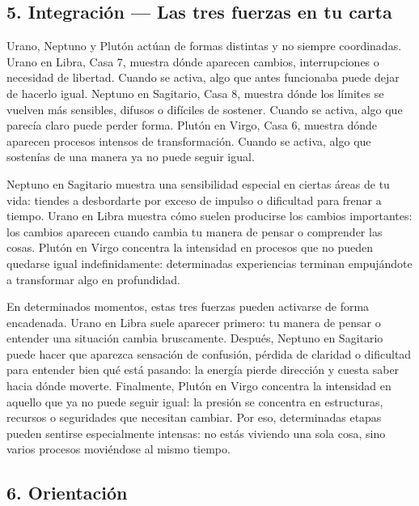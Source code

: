 \documentclass[11pt,a4paper]{article}
\begin{document}
\vspace{0.8cm}

\subsection{5. Integración — Las tres fuerzas en tu carta}

Urano, Neptuno y Plutón actúan de formas distintas y no siempre coordinadas. Urano en Libra, Casa 7, muestra dónde aparecen cambios, interrupciones o necesidad de libertad. Cuando se activa, algo que antes funcionaba puede dejar de hacerlo igual. Neptuno en Sagitario, Casa 8, muestra dónde los límites se vuelven más sensibles, difusos o difíciles de sostener. Cuando se activa, algo que parecía claro puede perder forma. Plutón en Virgo, Casa 6, muestra dónde aparecen procesos intensos de transformación. Cuando se activa, algo que sostenías de una manera ya no puede seguir igual.

Neptuno en Sagitario muestra una sensibilidad especial en ciertas áreas de tu vida: tiendes a desbordarte por exceso de impulso o dificultad para frenar a tiempo. Urano en Libra muestra cómo suelen producirse los cambios importantes: los cambios aparecen cuando cambia tu manera de pensar o comprender las cosas. Plutón en Virgo concentra la intensidad en procesos que no pueden quedarse igual indefinidamente: determinadas experiencias terminan empujándote a transformar algo en profundidad.

En determinados momentos, estas tres fuerzas pueden activarse de forma encadenada. Urano en Libra suele aparecer primero: tu manera de pensar o entender una situación cambia bruscamente. Después, Neptuno en Sagitario puede hacer que aparezca sensación de confusión, pérdida de claridad o dificultad para entender bien qué está pasando: la energía pierde dirección y cuesta saber hacia dónde moverte. Finalmente, Plutón en Virgo concentra la intensidad en aquello que ya no puede seguir igual: la presión se concentra en estructuras, recursos o seguridades que necesitan cambiar. Por eso, determinadas etapas pueden sentirse especialmente intensas: no estás viviendo una sola cosa, sino varios procesos moviéndose al mismo tiempo.

\vspace{0.8cm}

\subsection{6. Orientación}
\end{document}
